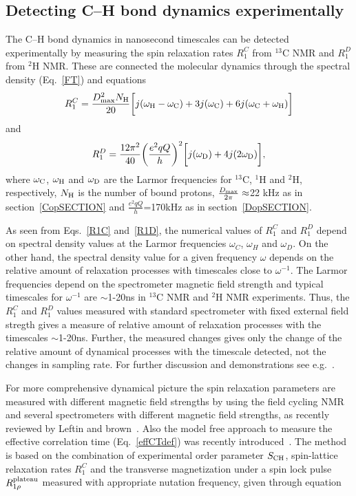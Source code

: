 \documentclass[aps,prl,superscriptaddress,twocolumn]{revtex4}
\begin{document}
\subsection{Detecting C--H bond dynamics experimentally}\label{dynamicsEXP}

The C--H bond dynamics in nanosecond timescales can be detected experimentally by measuring
the spin relaxation rates $R_1^C$ from $^{13}$C NMR and $R_1^D$ from $^2$H NMR. 
These are connected the molecular dynamics through the spectral density (Eq.~\ref{FT}) and equations \cite{harris86}
\begin{equation}\label{R1C}
R_{1}^{C}=\frac{D_{\rm{max}}^2N_{\rm{H}}}{20}\bigg[j(\omega_{\rm{H}}-\omega_{\rm{C}})+3j(\omega_{\rm{C}})+6j(\omega_{\rm{C}}+\omega_{\rm{H}})\bigg]
\end{equation}
and
\begin{equation}\label{R1D}
R_{1}^{D}=\frac{12\pi^2}{40}\bigg(\frac{e^2qQ}{h}\bigg)^2\bigg[j(\omega_{\rm{D}})+4j(2\omega_{\rm{D}})\bigg],
\end{equation}
where $\omega_{\rm{C}}$, $\omega_{\rm{H}}$ and $\omega_{\rm{D}}$ are the Larmor frequencies for $^{13}$C, $^1$H and $^2$H, respectively, 
$N_{\rm{H}}$ is the number of bound protons, $\frac{D_{\rm{max}}}{2\pi}\approx$22 kHz as in section~\ref{CopSECTION} and
$\frac{e^2qQ}{h}$=170kHz as in section~\ref{DopSECTION}.

As seen from Eqs.~\ref{R1C} and~\ref{R1D}, the numerical values of $R_1^{C}$ and $R_1^{D}$ depend on 
spectral density values at the Larmor frequencies $\omega_C$, $\omega_H$ and $\omega_D$.
On the other hand, the spectral density value for a given frequency $\omega$ 
depends on the relative amount of relaxation processes with timescales close to $\omega^{-1}$.
The Larmor frequencies depend on the spectrometer magnetic field strength and typical
timescales for $\omega^{-1}$ are $\sim$1-20ns in $^{13}$C NMR and $^2$H NMR experiments.
Thus, the $R_1^{C}$ and $R_1^{D}$ values measured with standard spectrometer with fixed external
field stregth gives a measure of relative amount of relaxation processes with the timescales $\sim$1-20ns.
Further, the measured changes gives only the change of the relative amount of dynamical processes with
the timescale detected, not the changes in sampling rate. For further discussion and demonstrations see e.g.~\cite{ferreira15}.

For more comprehensive dynamical picture the spin relaxation parameters are 
measured with different magnetic field strengths by using the field cycling NMR~\cite{roberts04a,roberts04b,roberts09,sivanandam09}
and several spectrometers with different magnetic field strengths, as recently reviewed by Leftin and brown~\cite{leftin11}.
Also the model free approach to measure the effective correlation time (Eq.~\ref{effCTdef}) was recently
introduced~\cite{ferreira15}. The method is based on the combination of experimental order parameter $S_{{\rm CH}}$,
spin-lattice relaxation rates $R_1^C$ and the transverse magnetization under a spin lock pulse $R_{1\rho}^{\rm{plateau}}$ 
measured with appropriate nutation frequency, given through equation
\end{document}
